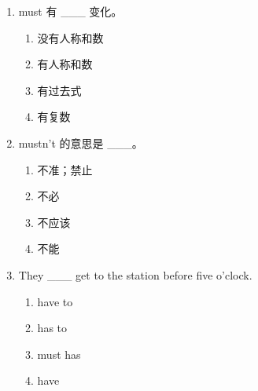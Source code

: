 \documentclass[11pt,a4paper]{ctexart}
\begin{document}
\begin{enumerate}[leftmargin=*,itemsep=4pt]
\begin{enumerate}[label=\Alph*.,leftmargin=2em,itemsep=1pt,topsep=2pt]
\item must
\item may
\end{enumerate}
\item must 有 \_\_\_ 变化。
\begin{enumerate}[label=\Alph*.,leftmargin=2em,itemsep=1pt,topsep=2pt]
\item 没有人称和数
\item 有人称和数
\item 有过去式
\item 有复数
\end{enumerate}
\item mustn’t 的意思是 \_\_\_。
\begin{enumerate}[label=\Alph*.,leftmargin=2em,itemsep=1pt,topsep=2pt]
\item 不准；禁止
\item 不必
\item 不应该
\item 不能
\end{enumerate}
\item They \_\_\_ get to the station before five o’clock.
\begin{enumerate}[label=\Alph*.,leftmargin=2em,itemsep=1pt,topsep=2pt]
\item have to
\item has to
\item must has
\item have
\end{enumerate}
\end{enumerate}
\end{document}
